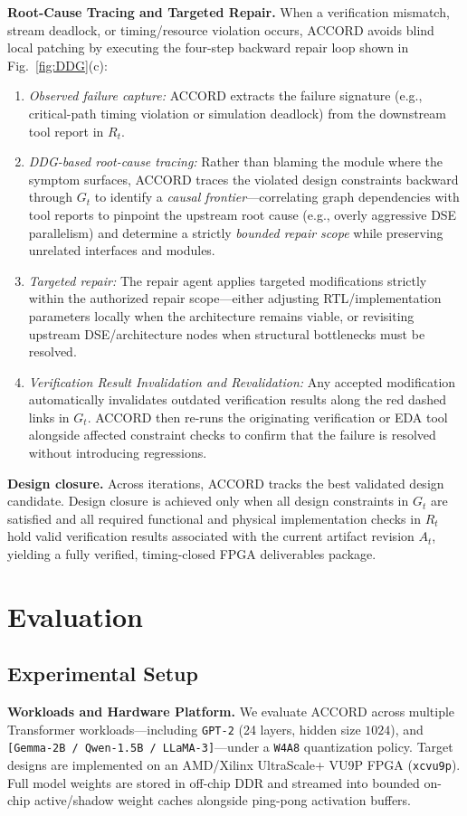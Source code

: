 \documentclass[9pt,conference]{IEEEtran}
\begin{document}
\textbf{Root-Cause Tracing and Targeted Repair.}
When a verification mismatch, stream deadlock, or timing/resource violation occurs, ACCORD avoids blind local patching by executing the four-step backward repair loop shown in Fig.~\ref{fig:DDG}(c):
\begin{enumerate}
\item \emph{Observed failure capture:} ACCORD extracts the failure signature (e.g., critical-path timing violation or simulation deadlock) from the downstream tool report in $R_t$.
\item \emph{DDG-based root-cause tracing:} Rather than blaming the module where the symptom surfaces, ACCORD traces the violated design constraints backward through $G_t$ to identify a \emph{causal frontier}—correlating graph dependencies with tool reports to pinpoint the upstream root cause (e.g., overly aggressive DSE parallelism) and determine a strictly \emph{bounded repair scope} while preserving unrelated interfaces and modules.
\item \emph{Targeted repair:} The repair agent applies targeted modifications strictly within the authorized repair scope—either adjusting RTL/implementation parameters locally when the architecture remains viable, or revisiting upstream DSE/architecture nodes when structural bottlenecks must be resolved.
\item \emph{Verification Result Invalidation and Revalidation:} Any accepted modification automatically invalidates outdated verification results along the red dashed links in $G_t$. ACCORD then re-runs the originating verification or EDA tool alongside affected constraint checks to confirm that the failure is resolved without introducing regressions.
\end{enumerate}

\textbf{Design closure.}
Across iterations, ACCORD tracks the best validated design candidate. Design closure is achieved only when all design constraints in $G_t$ are satisfied and all required functional and physical implementation checks in $R_t$ hold valid verification results associated with the current artifact revision $A_t$, yielding a fully verified, timing-closed FPGA deliverables package.


\section{Evaluation}

\subsection{Experimental Setup}
\textbf{Workloads and Hardware Platform.}
We evaluate ACCORD across multiple Transformer workloads—including \texttt{GPT-2} (24 layers, hidden size $1024$), and \texttt{[Gemma-2B / Qwen-1.5B / LLaMA-3]}—under a \texttt{W4A8} quantization policy. Target designs are implemented on an AMD/Xilinx UltraScale+ VU9P FPGA (\texttt{xcvu9p}). Full model weights are stored in off-chip DDR and streamed into bounded on-chip active/shadow weight caches alongside ping-pong activation buffers.
\end{document}
